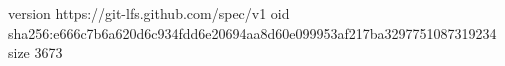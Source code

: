 version https://git-lfs.github.com/spec/v1
oid sha256:e666c7b6a620d6c934fdd6e20694aa8d60e099953af217ba3297751087319234
size 3673
